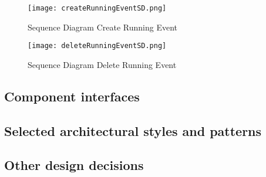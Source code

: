 \documentclass[../main.tex]{subfiles}
\begin{document}
\vspace*{2cm}

\begin{figure}[h]
        \centering
             \texttt{[image: createRunningEventSD.png]}
              \caption{Sequence Diagram Create Running Event }
               \label{fig:createRunningEventSD}
\end{figure}

\vspace*{2cm}

\begin{figure}[h]
        \centering
             \texttt{[image: deleteRunningEventSD.png]}
              \caption{Sequence Diagram Delete Running Event }
               \label{fig:deleteRunningEventSD}
\end{figure}

\subsection{Component interfaces}

\subsection{Selected architectural styles and patterns}

\subsection{Other design decisions}
\end{document}
